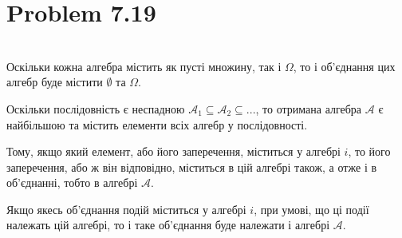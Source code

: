 \documentclass[12pt,letterpaper]{article}
\begin{document}
\section*{Problem 7.19}

\noindent{}
\newline \\

Оскільки кожна алгебра містить як пусті множину, так і $\Omega$, то і об'єднання
цих алгебр буде містити $\emptyset$ та $\Omega$.

Оскільки послідовність є неспадною $\mathcal{A}_1 \subseteq \mathcal{A}_2
\subseteq... $, то отримана алгебра $ \mathcal{A} $ є найбільшою та містить
елементи всіх алгебр у послідовності.

Тому, якщо який елемент, або його заперечення, міститься у алгебрі $i$, то його заперечення, або ж він відповідно, міститься в цій алгебрі також, а отже і в
об'єднанні, тобто в алгебрі $\mathcal{A}$.

Якщо якесь об'єднання подій міститься у алгебрі $i$, при умові, що ці події
належать цій алгебрі, то і таке об'єднання буде належати і алгебрі $\mathcal{A}$.

\end{document}
